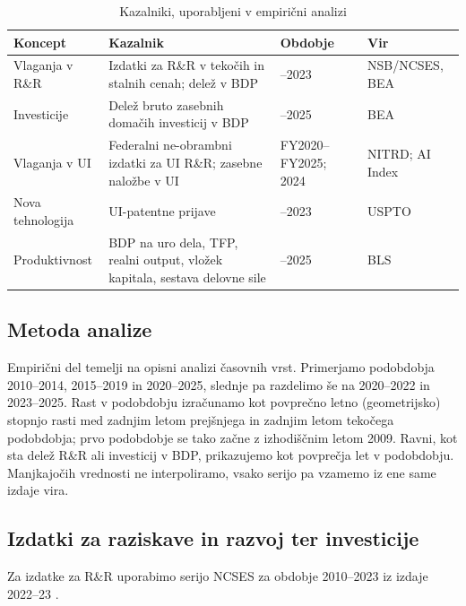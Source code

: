 \documentclass[12pt,a4paper]{article}
\begin{document}
\begin{table}[H]
\centering
\caption{Kazalniki, uporabljeni v empirični analizi}\label{tab:kazalniki}
\small
\begin{tabularx}{\textwidth}{>{\raggedright\arraybackslash}p{3.0cm} >{\raggedright\arraybackslash}X >{\centering\arraybackslash}p{2.4cm} >{\centering\arraybackslash}p{2.3cm}}
\toprule
\textbf{Koncept} & \textbf{Kazalnik} & \textbf{Obdobje} & \textbf{Vir} \\
\midrule
Vlaganja v R\&R & Izdatki za R\&R v tekočih in stalnih cenah; delež v BDP & 2010--2023 & NSB/NCSES, BEA \\
Investicije & Delež bruto zasebnih domačih investicij v BDP & 2010--2025 & BEA \\
Vlaganja v UI & Federalni ne-obrambni izdatki za UI R\&R; zasebne naložbe v UI & FY2020--FY2025; 2024 & NITRD; AI Index \\
Nova tehnologija & UI-patentne prijave & 2018--2023 & USPTO \\
Produktivnost & BDP na uro dela, TFP, realni output, vložek kapitala, sestava delovne sile & 2010--2025 & BLS \\
\bottomrule
\end{tabularx}
\end{table}

\subsection{Metoda analize}

Empirični del temelji na opisni analizi časovnih vrst. Primerjamo podobdobja 2010--2014, 2015--2019 in 2020--2025, slednje pa razdelimo še na 2020--2022 in 2023--2025. Rast v podobdobju izračunamo kot povprečno letno (geometrijsko) stopnjo rasti med zadnjim letom prejšnjega in zadnjim letom tekočega podobdobja; prvo podobdobje se tako začne z izhodiščnim letom 2009. Ravni, kot sta delež R\&R ali investicij v BDP, prikazujemo kot povprečja let v podobdobju. Manjkajočih vrednosti ne interpoliramo, vsako serijo pa vzamemo iz ene same izdaje vira.

\subsection{Izdatki za raziskave in razvoj ter investicije}

Za izdatke za R\&R uporabimo serijo NCSES za obdobje 2010--2023 iz izdaje 2022--23 \parencite[tab.~DISC-1]{nsb2025}.
\end{document}
